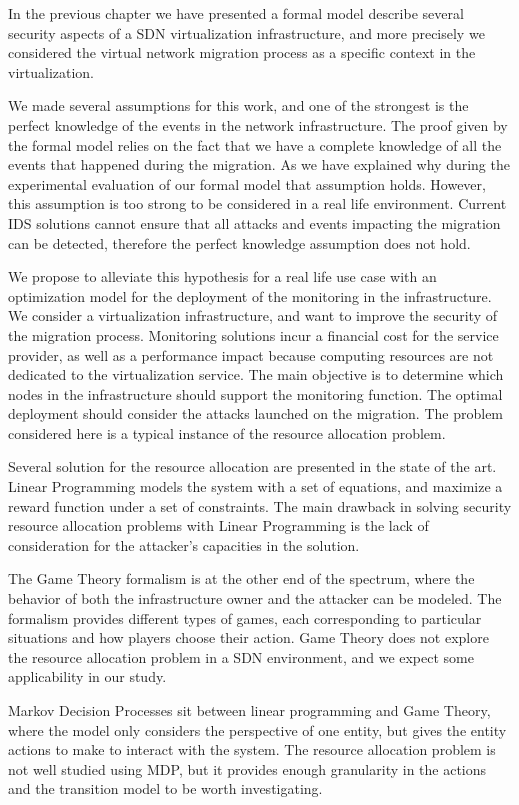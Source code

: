 In the previous chapter we have presented a formal model describe several security aspects of a SDN virtualization infrastructure, and more precisely we considered the virtual network migration process as a specific context in the virtualization.

We made several assumptions for this work, and one of the strongest is the perfect knowledge of the events in the network infrastructure. The proof given by the formal model relies on the fact that we have a complete knowledge of all the events that happened during the migration. As we have explained why during the experimental evaluation of our formal model that assumption holds. However, this assumption is too strong to be considered in a real life environment. Current IDS solutions cannot ensure that all attacks and events impacting the migration can be detected, therefore the perfect knowledge assumption does not hold.

We propose to alleviate this hypothesis for a real life use case with an optimization model for the deployment of the monitoring in the infrastructure.
We consider a virtualization infrastructure, and want to improve the security of the migration process.
Monitoring solutions incur a financial cost for the service provider, as well as a performance impact because computing resources are not dedicated to the virtualization service.
The main objective is to determine which nodes in the infrastructure should support the monitoring function.
The optimal deployment should consider the attacks launched on the migration.
The problem considered here is a typical instance of the resource allocation problem.

Several solution for the resource allocation are presented in the state of the art. 
Linear Programming models the system with a set of equations, and maximize a reward function under a set of constraints.
The main drawback in solving security resource allocation problems with Linear Programming is the lack of consideration for the attacker's capacities in the solution.

The Game Theory formalism is at the other end of the spectrum, where the behavior of both the infrastructure owner and the attacker can be modeled.
The formalism provides different types of games, each corresponding to particular situations and how players choose their action.
Game Theory does not explore the resource allocation problem in a SDN environment, and we expect some applicability in our study.

Markov Decision Processes sit between linear programming and Game Theory, where the model only considers the perspective of one entity, but gives the entity actions to make to interact with the system. The resource allocation problem is not well studied using MDP, but it provides enough granularity in the actions and the transition model to be worth investigating.


